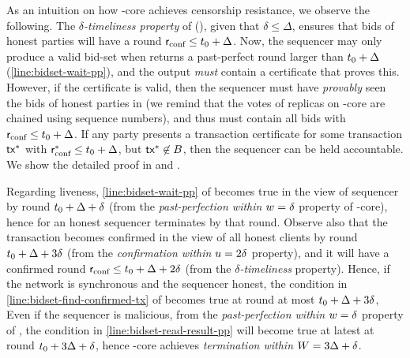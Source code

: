 As an intuition on how \bidsettm-core achieves censorship resistance, we observe the following.
The \emph{$\delta$-timeliness property} of \podtm (), given that $\delta \leq \Delta$, ensures that bids of honest parties will have a \confirmed round $\textsf{r}_\text{conf} \leq t_0 + \Delta$.
Now, the sequencer may only produce a valid bid-set when \podtm returns a past-perfect round larger than $t_0 + \Delta$ (\cref{line:bidset-wait-pp}), and the output \emph{must} contain a certificate \ppcert that proves this. However, if the certificate is valid, then the sequencer must have \emph{provably} seen the bids of honest parties in \txSet (we remind that the votes of replicas on \podtm-core are chained using sequence numbers), and thus \bag must contain all bids with $\textsf{r}_\text{conf} \leq t_0 + \Delta$. If any party presents a transaction certificate \txcert for some transaction $\textsf{tx}^*$ with $\textsf{r}_\text{conf}^* \leq t_0 + \Delta$, but $\textsf{tx}^* \not\in B$, then the sequencer can be held accountable. We show the detailed proof in  and .

Regarding liveness, \cref{line:bidset-wait-pp} of  becomes true in the view of sequencer by round $t_0 + \Delta + \delta$ (from the \emph{past-perfection within $w=\delta$} property of \podtm-core),
hence  for an honest sequencer terminates by that round.
Observe also that the transaction \msgbidresult{(\bag, \bidcert, \sigma)} becomes confirmed in the view of all honest clients by round $t_0 + \Delta + 3\delta$ (from the \emph{confirmation within $u=2\delta$} property), and it will have a confirmed round $\textsf{r}_\text{conf} \leq t_0 + \Delta + 2\delta$ (from the \emph{$\delta$-timeliness} property).
Hence, if the network is synchronous and the sequencer honest, the condition in \cref{line:bidset-find-confirmed-tx} of  becomes true at round at most $t_0 + \Delta + 3\delta$,
Even if the sequencer is malicious, from the \emph{past-perfection within $w=\delta$} property of \podtm, the condition in \cref{line:bidset-read-result-pp} will become true at latest at round $t_0 + 3 \Delta + \delta$, hence \bidsettm-core achieves \emph{termination within $W=3\Delta + \delta$}.





